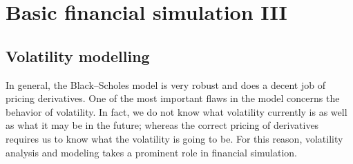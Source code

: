 \chapter{Basic financial simulation III}
\section{Volatility modelling}
\label{sec:volatility_modelling}
In general, the Black–Scholes model is very robust and does a decent job of pricing derivatives. One of the most important flaws in the model concerns the behavior of volatility. In fact, we do not know what volatility currently is as well as what it may be in the future; whereas the correct pricing of derivatives requires us to know what the volatility is going to be. For this reason, volatility analysis and modeling takes a prominent role in financial simulation.



